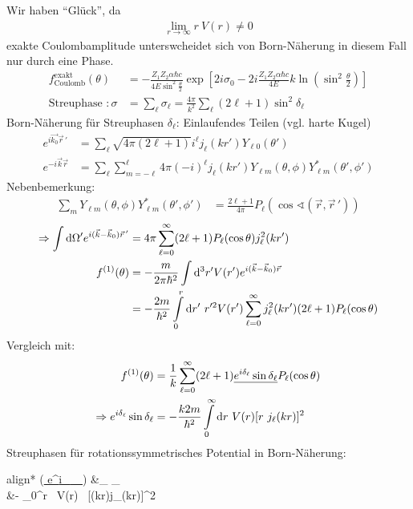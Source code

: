 	Wir haben ``Glück'', da
		\begin{align*}
			\underset{r \rightarrow \infty}{\lim} r ~V(r) \neq 0
		\end{align*}
	exakte Coulombamplitude unterswcheidet sich von Born-Näherung in diesem Fall nur durch eine Phase.
		\begin{align*}
			f^{\text{exakt}}_{\text{Coulomb}} (\theta) 
			&= -\frac{Z_1 Z_2 \alpha \hbar c}{4 E \sin^2 \frac{\theta}{2}} 
			\exp \left[ 2 i \sigma_0 - 
			2 i \frac{Z_1 Z_2 \alpha \hbar c}{4 E} k 
			\ln \left(\sin^2 \frac{\theta}{2} \right)
			\right] \\
			\text{Streuphase }: \sigma 
			&= \sum_\ell \sigma_\ell 
			= \frac{4 \pi}{k^2} \sum_\ell (2 \ell + 1) \sin^2 \delta_\ell
		\end{align*}
	Born-Näherung für Streuphasen $\delta_\ell$: Einlaufendes Teilen (vgl. harte Kugel)
		\begin{align*}
			e^{i \vec{k_0} \vec{r}\,'} 
			&= \sum_\ell \sqrt{4 \pi (2 \ell + 1)} 
			i^\ell j_\ell (kr') Y_{\ell 0} (\theta') \\
			e^{-i \vec{k} \vec{r}} 
			&= \sum_\ell \sum_{m = -\ell}^\ell
			4 \pi (-i)^\ell j_\ell (kr') Y_{\ell m} (\theta, \phi) Y^*_{\ell m} (\theta', \phi')
		\end{align*}
	Nebenbemerkung:
		\begin{align*}
			\sum_m Y_{\ell m} (\theta, \phi) Y^*_{\ell m} (\theta', \phi') 
			&= \frac{2 \ell + 1}{4 \pi} P_\ell (\cos \sphericalangle (\vec{r},\vec{r}\,'))
		\end{align*}
		\begin{align*}
			\Rightarrow \int \mathrm{d} \Omega' 
			e^{i(\vec{k}-\vec{k}_0) \vec{r}\,'} 
			&= 4 \pi \sum_{\ell=0}^\infty (2\ell + 1)
			P_\ell (\cos \theta) j_\ell^2 (kr') \\
			f^{(1)} (\theta) 
			&= -\frac{m}{2 \pi \hbar^2} 
			\int \mathrm{d}^3 r' V(r') e^{i(\vec{k}-\vec{k}_0)\vec{r}} \\
			&= - \frac{2 m}{\hbar^2}
			\int \limits_0^r \mathrm{d} r' ~r'^2 V(r') 
			\sum_{\ell = 0}^\infty j_\ell^2 (k r') 
			(2 \ell + 1) P_\ell (\cos \theta) 
		\end{align*}
	Vergleich mit:
		\begin{align*}
			f^{(1)}(\theta) 
			&= \frac{1}{k} \sum_{\ell=0}^{\infty} (2\ell + 1)
			\underline{e^{i\delta_\ell} \sin \delta_\ell} P_\ell (\cos \theta) \\
			\Rightarrow e^{i\delta_\ell} \sin \delta_\ell
			&= - \frac{k 2 m}{\hbar^2} 
			\int \limits_0^\infty \mathrm{d} r ~V(r) 
			[r ~j_\ell(kr)]^2
		\end{align*}
	Streuphasen für rotationssymmetrisches Potential in Born-Näherung:
		\begin{empheq}[box=\boxed]{align*}
			 (\underline{ e^{i\delta_\ell} \sin \delta_\ell})
			&\approx \delta_\ell
			\leftarrow \delta_\ell {} \\
			&\approx -
			\int \limits_0^\infty \diff r ~V(r) 
			~[(kr)j_\ell(kr)]^2
		\end{empheq}